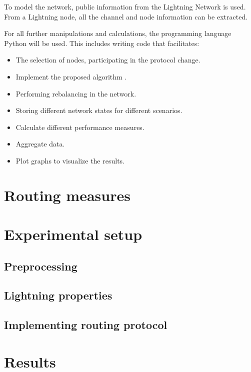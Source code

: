 \documentclass[final]{fhnwreport}       %
\begin{document}
To model the network, public information from the Lightning Network is used. From a Lightning node, all the channel and node information can be extracted.

For all further manipulations and calculations, the programming language Python will be used. This includes writing code that facilitates: 
\begin{itemize}
  \item The selection of nodes, participating in the protocol change.
  \item Implement the proposed algorithm \cite[p.~3]{pickhardt_imbalance_2019}.
  \item Performing rebalancing in the network.
  \item Storing different network states for different scenarios.
  \item Calculate different performance measures.
  \item Aggregate data.
  \item Plot graphs to visualize the results.
\end{itemize}

\section{Routing measures}
\section{Experimental setup}

\subsection{Preprocessing}

\subsection{Lightning properties}
\subsection{Implementing routing protocol}
\section{Results}
\end{document}
